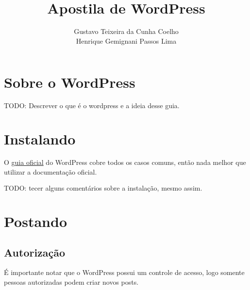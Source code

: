 \documentclass[12pt,onecolumn]{article}
\begin{document}
\title{Apostila de WordPress}
\author{Gustavo Teixeira da Cunha Coelho \\ Henrique Gemignani Passos Lima}
\maketitle

\section{Sobre o WordPress}
	TODO: Descrever o que é o wordpress e a ideia desse guia.

\section{Instalando}
	O \href{http://codex.wordpress.org/Installing_WordPress}{guia oficial} do 
	WordPress cobre todos os casos comuns, então nada melhor que utilizar a documentação oficial.
	
	TODO: tecer alguns comentários sobre a instalação, mesmo assim. \blindtext

\section{Postando}

	\subsection{Autorização}
		É importante notar que o WordPress possui um controle de acesso, logo 
		somente pessoas autorizadas podem criar novos posts.
		
\end{document}

